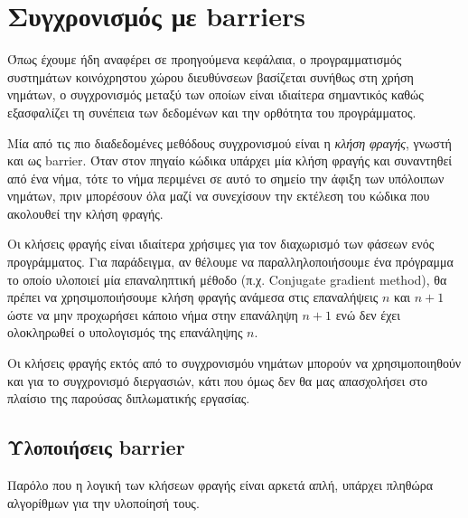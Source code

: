 \chapter{Συγχρονισμός με barriers}
\label{ch:Synchronization with Barriers}
Όπως έχουμε ήδη αναφέρει σε προηγούμενα κεφάλαια, ο προγραμματισμός συστημάτων κοινόχρηστου χώρου διευθύνσεων βασίζεται συνήθως στη χρήση νημάτων, ο συγχρονισμός μεταξύ των οποίων είναι ιδιαίτερα σημαντικός καθώς εξασφαλίζει τη συνέπεια των δεδομένων και την ορθότητα του προγράμματος.

Μία από τις πιο διαδεδομένες μεθόδους συγχρονισμού είναι η \textit{κλήση φραγής}, γνωστή και ως barrier. Όταν στον πηγαίο κώδικα υπάρχει μία κλήση φραγής και συναντηθεί από ένα νήμα, τότε το νήμα περιμένει σε αυτό το σημείο την άφιξη των υπόλοιπων νημάτων, πριν μπορέσουν όλα μαζί να συνεχίσουν την εκτέλεση του κώδικα που ακολουθεί την κλήση φραγής.


Οι κλήσεις φραγής είναι ιδιαίτερα χρήσιμες για τον διαχωρισμό των φάσεων ενός προγράμματος. Για παράδειγμα, αν θέλουμε να παραλληλοποιήσουμε ένα πρόγραμμα το οποίο υλοποιεί μία επαναληπτική μέθοδο (π.χ. Conjugate gradient method), θα πρέπει να χρησιμοποιήσουμε κλήση φραγής ανάμεσα στις επαναλήψεις $n$ και $n+1$ ώστε να μην προχωρήσει κάποιο νήμα στην επανάληψη $n+1$ ενώ δεν έχει ολοκληρωθεί ο υπολογισμός της επανάληψης $n$.

Οι κλήσεις φραγής εκτός από το συγχρονισμόυ νημάτων μπορούν να χρησιμοποιηθούν και για το συγχρονισμό διεργασιών, κάτι που όμως δεν θα μας απασχολήσει στο πλαίσιο της παρούσας διπλωματικής εργασίας.

\section{Υλοποιήσεις barrier}
\label{sec:Barrier Implementations}
Παρόλο που η λογική των κλήσεων φραγής είναι αρκετά απλή, υπάρχει πληθώρα αλγορίθμων για την υλοποίησή τους. 

